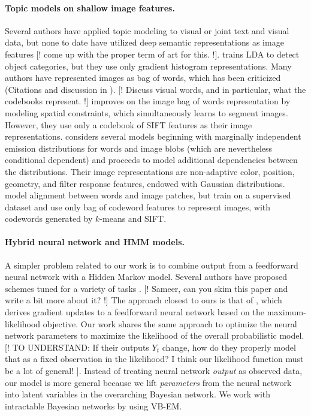 \documentclass{article}
\begin{document}
\paragraph{Topic models on shallow image features.}
Several authors have applied topic modeling to visual or joint text and visual data, but none to date have utilized deep semantic representations as image features [! come up with the proper term of art for this. !].
\citet{Fritz08} trains LDA to detect object categories, but they use only gradient histogram representations.
Many authors have represented images as bag of words, which has been criticized (Citations and discussion in \citet{Cao07}).
[! Discuss visual words, and in particular, what the codebooks represent. !]
\citet{Cao07} improves on the image bag of words representation by modeling spatial constraints, which simultaneously learns to segment images. However, they use only a codebook of SIFT features as their image representations.
\citet{Barnard03} considers several models beginning with marginally independent emission distributions for words and image blobs (which are nevertheless conditional dependent) and proceeds to model additional dependencies between the distributions. Their image representations are non-adaptive color, position, geometry, and filter response features, endowed with Gaussian distributions.
\citet{Wang09} model alignment between words and image patches, but train on a supervised dataset and use only bag of codeword features to represent images, with codewords generated by $k$-means and SIFT.

\paragraph{Hybrid neural network and HMM models.}
A simpler problem related to our work is to combine output from a feedforward neural network with a Hidden Markov model. Several authors have proposed schemes tuned for a variety of tasks \citet{Trentin01}. [! Sameer, can you skim this paper and write a bit more about it? !] The approach closest to ours is that of \citet{Bengio92}, which derives gradient updates to a feedforward neural network based on the maximum-likelihood objective. Our work shares the same approach to optimize the neural network parameters to maximize the likelihood of the overall probabilistic model. [! TO UNDERSTAND: If their outputs $Y_t$ change, how do they properly model that as a fixed observation in the likelihood? I think our likelihood function must be a lot of general! ]. Instead of treating neural network \emph{output} as observed data, our model is more general because we lift \emph{parameters} from the neural network into latent variables in the overarching Bayesian network. We work with intractable Bayesian networks by using VB-EM.
\end{document}
